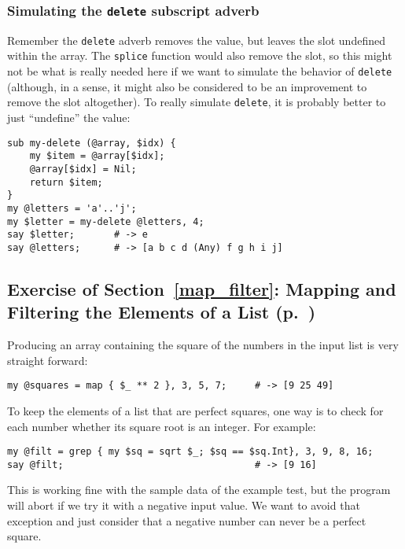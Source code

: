 \subsubsection{Simulating the {\tt delete} subscript adverb}

Remember the {\tt delete} adverb removes the value, but 
leaves the slot undefined within the array. The {\tt splice} 
function would also remove the slot, so this might not be 
what is really needed here if we want to simulate the 
behavior of {\tt delete} (although, in a sense, it might 
also be considered to be an improvement to remove the slot
altogether). To really simulate {\tt delete}, it is probably 
better to just ``undefine'' the value:

\begin{verbatim}
sub my-delete (@array, $idx) {
    my $item = @array[$idx];
    @array[$idx] = Nil;
    return $item;
}
my @letters = 'a'..'j';
my $letter = my-delete @letters, 4;
say $letter;       # -> e
say @letters;      # -> [a b c d (Any) f g h i j]
\end{verbatim}

\subsection{Exercise of Section~\ref{map_filter}: Mapping and Filtering the Elements of a List (p.~\pageref{exercise_squares})}
\label{sol_exercise_squares}

Producing an array containing the square of the numbers in the input list is very straight forward:

\begin{verbatim}
my @squares = map { $_ ** 2 }, 3, 5, 7;     # -> [9 25 49]
\end{verbatim}
%

To keep the elements of a list that are perfect squares, one 
way is to check for each number whether its square root 
is an integer. For example:

\begin{verbatim}
my @filt = grep { my $sq = sqrt $_; $sq == $sq.Int}, 3, 9, 8, 16;
say @filt;                                  # -> [9 16]
\end{verbatim}
%

This is working fine with the sample data of the example test, 
but the program will abort if we try it with a negative input 
value. We want to avoid that exception and just 
consider that a negative number can never be a perfect square.

